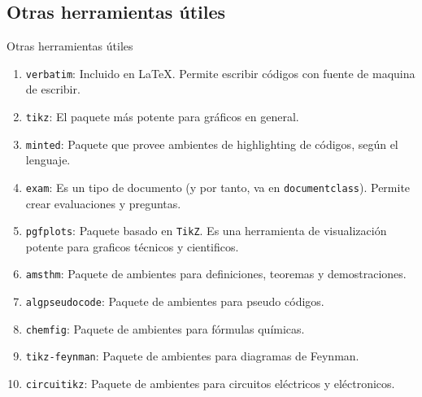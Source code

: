 \documentclass[../slides.tex]{subfiles}
\begin{document}
    \subsection{Otras herramientas útiles}
    \begin{frame}{Otras herramientas útiles}
       \begin{enumerate}
            \item \texttt{verbatim}: Incluido en \LaTeX{}. Permite escribir códigos con fuente de maquina de escribir.
            \item \texttt{tikz}: El paquete más potente para gráficos en general.
            \item \texttt{minted}: Paquete que provee ambientes de highlighting de códigos, según el lenguaje.
            \item \texttt{exam}: Es un tipo de documento (y por tanto, va en \texttt{documentclass}). Permite crear evaluaciones y preguntas.
            \item \texttt{pgfplots}: Paquete basado en \texttt{TikZ}. Es una herramienta de visualización potente para graficos técnicos y cientificos.
            \item \texttt{amsthm}: Paquete de ambientes para definiciones, teoremas y demostraciones.
            \item \texttt{algpseudocode}: Paquete de ambientes para pseudo códigos.
            \item \texttt{chemfig}: Paquete de ambientes para fórmulas químicas.
            \item \texttt{tikz-feynman}: Paquete de ambientes para diagramas de Feynman.
            \item \texttt{circuitikz}: Paquete de ambientes para circuitos eléctricos y eléctronicos.
       \end{enumerate}

    \end{frame}
    
\end{document}

